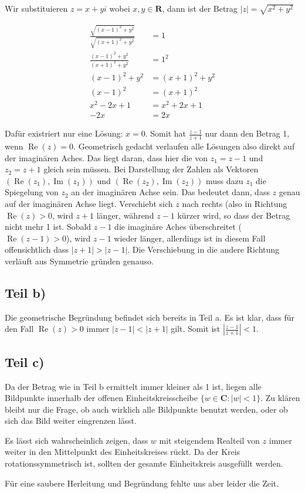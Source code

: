 \documentclass[a4paper,german,12pt]{article}
\begin{document}
Wir substituieren $z = x+yi$ wobei $x,y \in \mathbf{R}$, dann ist der Betrag
$|z| = \sqrt{x^2+y^2}$

\begin{align}
\frac{\sqrt{(x-1)^2+y^2}}{\sqrt{(x+1)^2+y^2}} &= 1 \\
\frac{(x-1)^2+y^2}{(x+1)^2+y^2} &= 1^2 \\
(x-1)^2+y^2 &= (x+1)^2+y^2 \\
(x-1)^2 &= (x+1)^2 \\
x^2-2x+1 &= x^2+2x+1 \\
-2x &= 2x
\end{align}

Dafür existriert nur eine Lösung: $x = 0$. Somit hat $\frac{z-1}{z+1}$ nur dann den
Betrag 1, wenn $\operatorname{Re}(z) = 0$. Geometrisch gedacht verlaufen
alle Lösungen also direkt auf der imaginären Aches. Das liegt daran, dass hier
die von $z_1 = z-1$ und $z_2 = z+1$ gleich sein müssen. Bei Darstellung der
Zahlen als Vektoren $(\operatorname{Re}(z_1), \operatorname{Im}(z_1))$ und
$(\operatorname{Re}(z_2), \operatorname{Im}(z_2))$ muss dazu $z_1$ die
Spiegelung von $z_2$ an der imaginären Achse sein. Das bedeutet dann, dass $z$
genau auf der imaginären Achse liegt.
Verschiebt sich $z$ nach rechts (also in Richtung $\operatorname{Re}(z) > 0$,
wird $z+1$ länger, während $z-1$ kürzer wird, so dass der Betrag nicht mehr 1
ist. Sobald $z-1$ die imaginäre Aches überschreitet ($\operatorname{Re}(z-1) >
0$), wird $z-1$ wieder länger, allerdings ist in diesem Fall offensichtlich
dass $|z+1| > |z-1|$. Die Verschiebung in die andere Richtung verläuft aus
Symmetrie gründen genauso.

\subsection*{Teil b)}

Die geometrische Begründung befindet sich bereits in Teil a. Es ist klar, dass
für den Fall $\operatorname{Re}(z) > 0$ immer $|z-1| < |z+1|$ gilt. Somit ist
$\left|\frac{z-1}{z+1}\right| < 1$.

\subsection*{Teil c)}

Da der Betrag wie in Teil b ermittelt immer kleiner als 1 ist, liegen alle
Bildpunkte innerhalb der offenen Einheitskreisscheibe $\{w \in \mathbf{C} : |w|
< 1\}$. Zu klären bleibt nur die Frage, ob auch wirklich alle Bildpunkte benutzt
werden, oder ob sich das Bild weiter eingrenzen lässt.

Es lässt sich wahrscheinlich zeigen, dass $w$ mit steigendem Realteil von $z$
immer weiter in den Mittelpunkt des Einheitskreises rückt. Da der Kreis
rotationssymmetrisch ist, sollten der gesamte Einheitskreis ausgefüllt werden.

Für eine saubere Herleitung und Begründung fehlte uns aber leider die Zeit.
\end{document}
